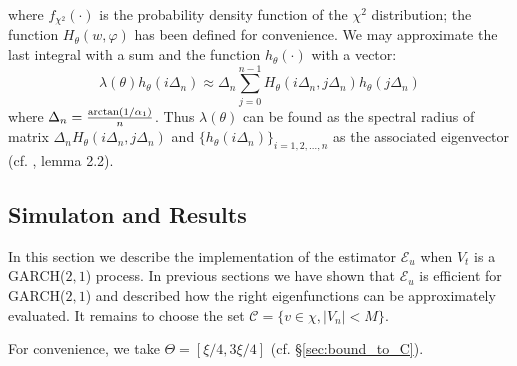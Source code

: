where $f_{\chi^2}(\cdot)$ is the probability density function of the
$\chi^2$ distribution; the function $H_\theta(w, \varphi)$ has been defined
for convenience.
We may approximate the last integral with a sum and the function
$h_\theta(\cdot)$ with a vector:
\[
\lambda(\theta) h_\theta(i \Delta_n)
\approx
\Delta_n \sum_{j=0}^{n-1} H_\theta(i \Delta_n, j \Delta_n) h_\theta(j \Delta_n)
\]
where $\Delta_n = {\arctan(1/\alpha_1) \over n}$.
Thus $\lambda(\theta)$ can be found as the spectral radius of 
matrix $\Delta_n H_\theta(i \Delta_n, j \Delta_n)$ and 
$\{h_\theta(i \Delta_n)\}_ {i=1,2,\dots, n}$ as the associated
eigenvector (cf. \cite{collamore:mentemeier:2016}, lemma 2.2).

\subsection{Simulaton and Results}
In this section we describe the implementation of the estimator
$\mathcal E_u$ when $V_t$ is a GARCH($2, 1$) process. In previous
sections we have shown that $\mathcal E_u$ is efficient for
GARCH($2, 1$) and described how the right eigenfunctions can be
approximately evaluated. It remains to choose the set
$\mathcal C = \{v \in \chi, |V_n| < M\}$.

For convenience, we take $\Theta = [\xi/4, 3\xi/4]$
(cf. \S\ref{sec:bound_to_C}).



  

